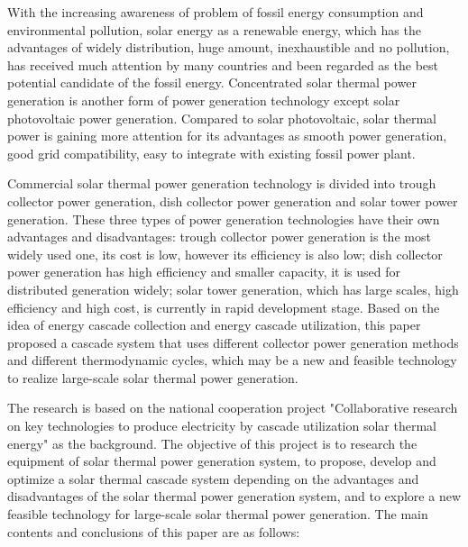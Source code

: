 \enabstract
{
With the increasing awareness of problem of fossil energy consumption and environmental pollution, solar energy as a renewable energy, which has the advantages of widely distribution, huge amount, inexhaustible and no pollution, has received much attention by many countries and been regarded as the best potential candidate of the fossil energy. Concentrated solar thermal power generation is another form of power generation technology except solar photovoltaic power generation. Compared to solar photovoltaic, solar thermal power is gaining more attention for its advantages as smooth power generation, good grid compatibility, easy to integrate with existing fossil power plant.

Commercial solar thermal power generation technology is divided into trough collector power generation, dish collector power generation and solar tower power generation. These three types of power generation technologies have their own advantages and disadvantages: trough collector power generation is the most widely used one, its cost is low, however its efficiency is also low; dish collector power generation has high efficiency and smaller capacity, it is used for distributed generation widely; solar tower generation, which has large scales, high efficiency and high cost, is currently in rapid development stage. Based on the idea of ​​energy cascade collection and energy cascade utilization, this paper proposed a cascade system that uses different collector power generation methods and different thermodynamic cycles, which may be a new and feasible technology to realize large-scale solar thermal power generation.

The research is based on the national cooperation project "Collaborative research on key technologies to produce electricity by cascade utilization solar thermal energy" as the background. The objective of this project is to research the equipment of solar thermal power generation system, to propose, develop and optimize a solar thermal cascade system depending on the advantages and disadvantages of the solar thermal power generation system, and to explore a new feasible technology for large-scale solar thermal power generation. The main contents and conclusions of this paper are as follows:

}
